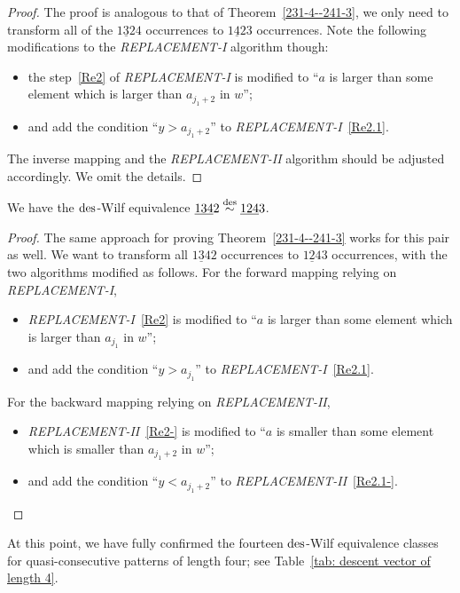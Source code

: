 \begin{proof}
  The proof is analogous to that of Theorem~\ref{231-4--241-3}, we only need to transform all of the $\underline{132}4$ occurrences to $\underline{142}3$ occurrences. Note the following modifications to the \textit{REPLACEMENT-I} algorithm though:
  \begin{itemize}
      \item  the step~\ref{Re2} of \textit{REPLACEMENT-I} is modified to ``$a$ is larger than some element which is larger than $a_{j_1+2}$ in $w$'';
      \item  and add the condition ``$y>a_{j_1+2}$'' to \textit{REPLACEMENT-I}~\ref{Re2.1}. 
  \end{itemize}
  The inverse mapping and the \textit{REPLACEMENT-II} algorithm should be adjusted accordingly. We omit the details.
\end{proof}

\begin{theorem}
  We have the $\mathrm{des}$-Wilf equivalence $\underline{134}2 \overset{\mathrm{des}}{\sim } \underline{124}3$.  \label{134-2--124-3}   
\end{theorem}

\begin{proof}
  The same approach for proving Theorem~\ref{231-4--241-3} works for this pair as well. We want to transform all $\underline{134}2$ occurrences to $\underline{124}3$ occurrences, with the two algorithms modified as follows. For the forward mapping relying on \textit{REPLACEMENT-I},
  \begin{itemize}
      \item  \textit{REPLACEMENT-I}~\ref{Re2} is modified to ``$a$ is larger than some element which is larger than $a_{j_1}$ in $w$'';
      \item  and add the condition ``$y>a_{j_1}$'' to \textit{REPLACEMENT-I}~\ref{Re2.1}. 
  \end{itemize}
  For the backward mapping relying on \textit{REPLACEMENT-II}, 
  \begin{itemize}
      \item \textit{REPLACEMENT-II}~\ref{Re2-} is modified to ``$a$ is smaller than some element which is smaller than $a_{j_1+2}$ in $w$'';
      \item  and add the condition ``$y<a_{j_1+2}$'' to \textit{REPLACEMENT-II}~\ref{Re2.1-}. \qedhere
  \end{itemize}
\end{proof}

At this point, we have fully confirmed the fourteen $\mathrm{des}$-Wilf equivalence classes for quasi-consecutive patterns of length four; see Table~\ref{tab: descent vector of length 4}.
